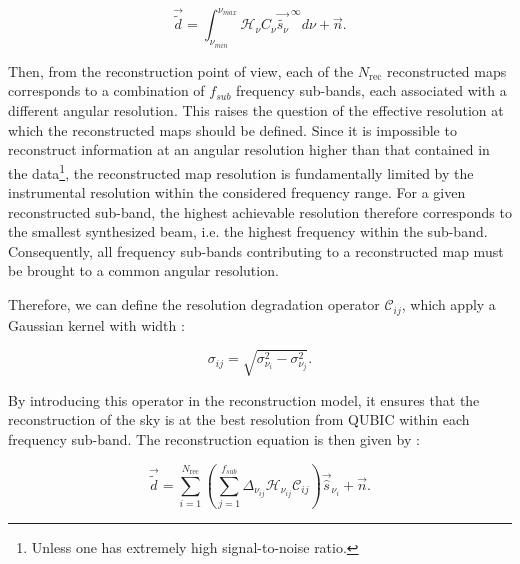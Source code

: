 \documentclass[../../thesis.tex]{subfiles}
\begin{document}
\begin{equation}
    \vec{\tilde{d}} = \int_{\nu_{min}}^{\nu_{max}} \mathcal{H}_\nu C_\nu \vec{\tilde{s_\nu}}^{~\infty} d\nu + \vec{n}.
\end{equation}

Then, from the reconstruction point of view, each of the $N_\text{rec}$ reconstructed maps corresponds to a combination of $f_{sub}$ frequency sub-bands, each associated with a different angular resolution. This raises the question of the effective resolution at which the reconstructed maps should be defined. Since it is impossible to reconstruct information at an angular resolution higher than that contained in the data\footnote{Unless one has extremely high signal-to-noise ratio.}, the reconstructed map resolution is fundamentally limited by the instrumental resolution within the considered frequency range. For a given reconstructed sub-band, the highest achievable resolution therefore corresponds to the smallest synthesized beam, i.e. the highest frequency within the sub-band. Consequently, all frequency sub-bands contributing to a reconstructed map must be brought to a common angular resolution. 


Therefore, we can define the resolution degradation operator $\mathcal{C}_{ij}$, which apply a Gaussian kernel with width :

\begin{equation}
    \sigma_{ij} = \sqrt{\sigma_{\nu_i}^2 - \sigma_{\nu_j}^2}.
\end{equation}

By introducing this operator in the reconstruction model, it ensures that the reconstruction of the sky is at the best resolution from QUBIC within each frequency sub-band. The reconstruction equation is then given by :

\begin{equation}
    \vec{\tilde{d}} = \sum_{i=1}^{N_\text{rec}}\left(\sum_{j=1}^{f_{sub}}\Delta_{\nu_{ij}}\mathcal{H}_{\nu_{ij}}\mathcal{C}_{ij}\right)\vec{\hat{s}}_{\nu_i} + \vec{n}.
\end{equation}
\end{document}

